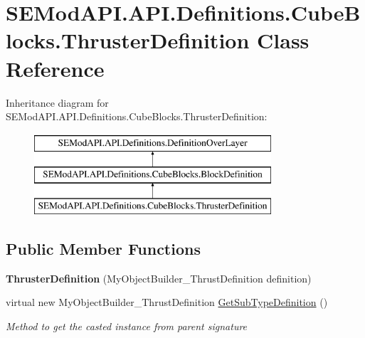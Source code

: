 \hypertarget{class_s_e_mod_a_p_i_1_1_a_p_i_1_1_definitions_1_1_cube_blocks_1_1_thruster_definition}{}\section{S\+E\+Mod\+A\+P\+I.\+A\+P\+I.\+Definitions.\+Cube\+Blocks.\+Thruster\+Definition Class Reference}
\label{class_s_e_mod_a_p_i_1_1_a_p_i_1_1_definitions_1_1_cube_blocks_1_1_thruster_definition}
Inheritance diagram for S\+E\+Mod\+A\+P\+I.\+A\+P\+I.\+Definitions.\+Cube\+Blocks.\+Thruster\+Definition\+:\begin{figure}[H]
\begin{center}
\leavevmode
\includegraphics[height=3.000000cm]{class_s_e_mod_a_p_i_1_1_a_p_i_1_1_definitions_1_1_cube_blocks_1_1_thruster_definition}
\end{center}
\end{figure}
\subsection*{Public Member Functions}
\begin{DoxyCompactItemize}
\item 
\hypertarget{class_s_e_mod_a_p_i_1_1_a_p_i_1_1_definitions_1_1_cube_blocks_1_1_thruster_definition_a942826a76953f39c8cf449c8f94cc141}{}{\bfseries Thruster\+Definition} (My\+Object\+Builder\+\_\+\+Thrust\+Definition definition)\label{class_s_e_mod_a_p_i_1_1_a_p_i_1_1_definitions_1_1_cube_blocks_1_1_thruster_definition_a942826a76953f39c8cf449c8f94cc141}

\item 
virtual new My\+Object\+Builder\+\_\+\+Thrust\+Definition \hyperlink{class_s_e_mod_a_p_i_1_1_a_p_i_1_1_definitions_1_1_cube_blocks_1_1_thruster_definition_a7158efad5eee51be57ff2e18e6a3a832}{Get\+Sub\+Type\+Definition} ()
\begin{DoxyCompactList}\small\item\em Method to get the casted instance from parent signature \end{DoxyCompactList}\end{DoxyCompactItemize}
